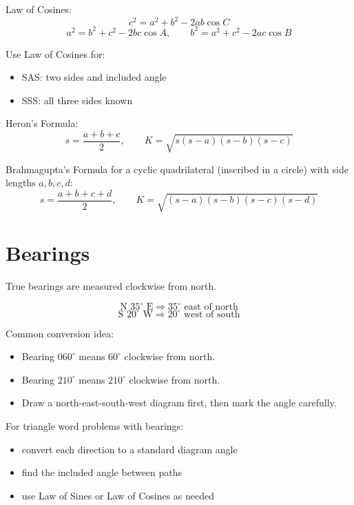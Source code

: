 \documentclass[11pt]{article}
\begin{document}
Law of Cosines:
\[
c^2=a^2+b^2-2ab\cos C
\]
\[
a^2=b^2+c^2-2bc\cos A,\qquad
b^2=a^2+c^2-2ac\cos B
\]

Use Law of Cosines for:
\begin{itemize}
  \item SAS: two sides and included angle
  \item SSS: all three sides known
\end{itemize}

Heron's Formula:
\[
s=\frac{a+b+c}{2},\qquad
K=\sqrt{s(s-a)(s-b)(s-c)}
\]

Brahmagupta's Formula for a cyclic quadrilateral (inscribed in a circle) with side lengths $a,b,c,d$:
\[
s=\frac{a+b+c+d}{2},\qquad
K=\sqrt{(s-a)(s-b)(s-c)(s-d)}
\]

\section*{Bearings}
True bearings are measured clockwise from north.

\[
\text{N }35^\circ\text{ E} \Rightarrow 35^\circ \text{ east of north}
\]
\[
\text{S }20^\circ\text{ W} \Rightarrow 20^\circ \text{ west of south}
\]

Common conversion idea:
\begin{itemize}
  \item Bearing $060^\circ$ means $60^\circ$ clockwise from north.
  \item Bearing $210^\circ$ means $210^\circ$ clockwise from north.
  \item Draw a north-east-south-west diagram first, then mark the angle carefully.
\end{itemize}

For triangle word problems with bearings:
\begin{itemize}
  \item convert each direction to a standard diagram angle
  \item find the included angle between paths
  \item use Law of Sines or Law of Cosines as needed
\end{itemize}
\end{document}
